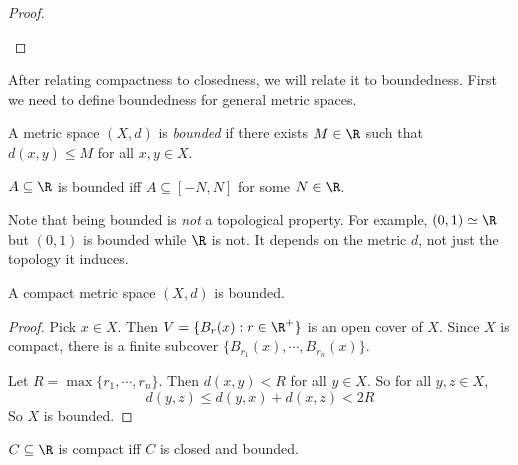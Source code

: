 \documentclass[a4paper]{article}
\begin{document}
\begin{proof}
\begin{center}
  \end{center}
\end{proof}

After relating compactness to closedness, we will relate it to boundedness. First we need to define boundedness for general metric spaces.
\begin{defi}
  A metric space $(X, d)$ is \emph{bounded} if there exists $M\in \R$ such that $d(x, y) \leq M$ for all $x, y\in X$.
\end{defi}

\begin{eg}
  $A\subseteq \R$ is bounded iff $A\subseteq [-N, N]$ for some $N\in \R$.
\end{eg}
Note that being bounded is \emph{not} a topological property. For example, $(0, 1)\simeq \R$ but $(0, 1)$ is bounded while $\R$ is not. It depends on the metric $d$, not just the topology it induces.

\begin{prop}
  A compact metric space $(X, d)$ is bounded.
\end{prop}

\begin{proof}
  Pick $x\in X$. Then $V = \{B_r(x): r\in \R^+\}$ is an open cover of $X$. Since $X$ is compact, there is a finite subcover $\{B_{r_1}(x), \cdots, B_{r_n}(x)\}$.

  Let $R = \max\{r_1, \cdots, r_n\}$. Then $d(x, y) < R$ for all $y\in X$. So for all $y, z\in X$, 
  \[
    d(y, z) \leq d(y, x) + d(x, z) < 2R
  \]
  So $X$ is bounded.
\end{proof}

\begin{thm}
  $C\subseteq \R$ is compact iff $C$ is closed and bounded.
\end{thm}
\end{document}
